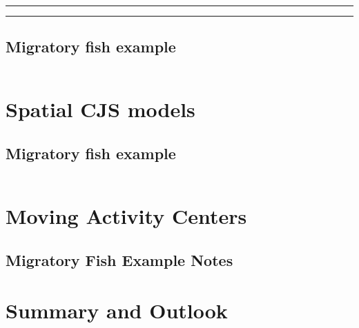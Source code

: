 \begin{table}[htb!]
\centering
\begin{tabular}{crrr}
\hline \hline
\end{tabular}
\label{open.tab.CJSmulti-matrix}
\end{table}



\begin{panel}[htp]
\centering
\rule[0.1in]{\textwidth}{.03in}
\rule[-0.1in]{\textwidth}{.03in}
\label{open.panel.msCJS}
\end{panel}



\subsection{Migratory fish example}


\begin{table}
\centering
\begin{tabular}{crrrrr}
\hline \hline
\hline
\end{tabular}
\label{open.tab.multi-shad}
\end{table}

\section{Spatial CJS models}

\subsection{Migratory fish example}


\begin{table}
\centering
\begin{tabular}{crrrrr}
\end{tabular}
\label{open.tab.shad1}
\end{table}


\section{Moving Activity Centers}



\subsection{Migratory Fish Example Notes}


\section{Summary and Outlook}


